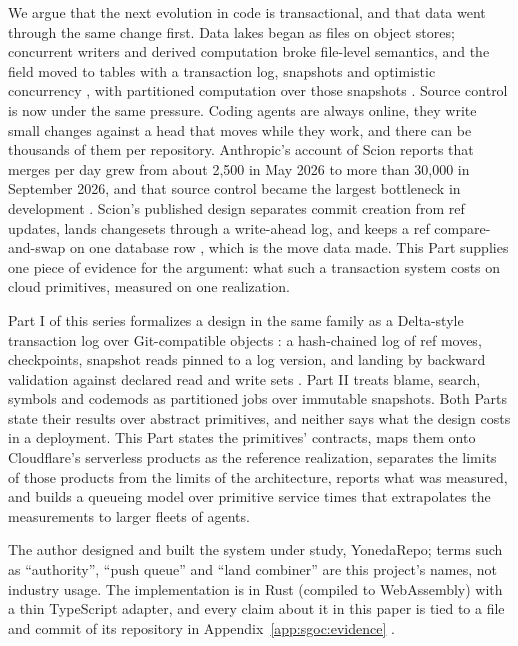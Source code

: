 \documentclass[11pt,letterpaper]{article}
\theoremstyle{definition}
\theoremstyle{remark}
\begin{document}
We argue that the next evolution in code is transactional, and that data went through the same change first. Data lakes began as files on object stores; concurrent writers and derived computation broke file-level semantics, and the field moved to tables with a transaction log, snapshots and optimistic concurrency \cite{armbrust2020delta}, with partitioned computation over those snapshots \cite{zaharia2012rdd}. Source control is now under the same pressure. Coding agents are always online, they write small changes against a head that moves while they work, and there can be thousands of them per repository. Anthropic's account of Scion reports that merges per day grew from about 2,500 in May 2026 to more than 30,000 in September 2026, and that source control became the largest bottleneck in development \cite{anthropic2026scion}. %
Scion's published design separates commit creation from ref updates, lands changesets through a write-ahead log, and keeps a ref compare-and-swap on one database row \cite{anthropic2026scion}, which is the move data made. %
This Part supplies one piece of evidence for the argument: what such a transaction system costs on cloud primitives, measured on one realization.

Part I of this series \cite{long2026partI} formalizes a design in the same family as a Delta-style transaction log over Git-compatible objects \cite{armbrust2020delta}: a hash-chained log of ref moves, checkpoints, snapshot reads pinned to a log version, and landing by backward validation against declared read and write sets \cite{kung1981occ}. Part II \cite{long2026partII} treats blame, search, symbols and codemods as partitioned jobs over immutable snapshots. Both Parts state their results over abstract primitives, and neither says what the design costs in a deployment. This Part states the primitives' contracts, maps them onto Cloudflare's serverless products as the reference realization, separates the limits of those products from the limits of the architecture, reports what was measured, and builds a queueing model over primitive service times that extrapolates the measurements to larger fleets of agents.

The author designed and built the system under study, YonedaRepo; terms such as ``authority'', ``push queue'' and ``land combiner'' are this project's names, not industry usage. The implementation is in Rust (compiled to WebAssembly) with a thin TypeScript adapter, and every claim about it in this paper is tied to a file and commit of its repository in Appendix~\ref{app:sgoc:evidence} \cite{yonedarepo}.
\end{document}
